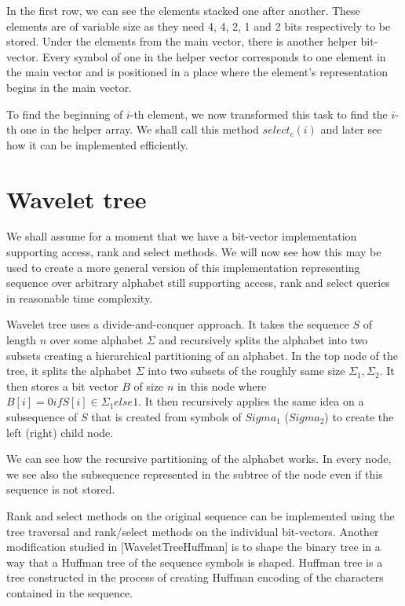 In the first row, we can see the elements stacked one after another. These elements
are of variable size as they need 4, 4, 2, 1 and 2 bits respectively to be stored.
Under the elements from the main vector, there is another helper bit-vector. Every
symbol of one in the helper vector corresponds to one element in the main vector
and is positioned in a place where the element's representation begins in the main vector.

To find the beginning of $i$-th element, we now transformed this task to find the
$i$-th one in the helper array. We shall call this method $select_c(i)$ and later
see how it can be implemented efficiently.

\section{Wavelet tree}
We shall assume for a moment that we have a bit-vector implementation supporting
access, rank and select methods. We will now see how this may be used to create
a more general version of this implementation representing sequence over arbitrary
alphabet still supporting access, rank and select queries in reasonable time complexity.

Wavelet tree uses a divide-and-conquer approach. It takes the sequence $S$ of
length $n$ over some alphabet $\Sigma$ and recursively splits the alphabet into
two subsets creating a hierarchical partitioning of an alphabet. In the top node
of the tree, it splits the alphabet $\Sigma$ into two subsets of the roughly same
size $\Sigma_1, \Sigma_2$. It then stores a bit vector $B$ of size $n$ in this node
where $B[i] = 0 if S[i] \in \Sigma_1 else 1$. It then recursively applies the same
idea on a subsequence of $S$ that is created from symbols of $Sigma_1$ ($Sigma_2$)
to create the left (right) child node.


We can see how the recursive partitioning of the alphabet works. In every node,
we see also the subsequence represented in the subtree of the node even if this
sequence is not stored. 

Rank and select methods on the original sequence can be implemented using the tree
traversal and rank/select methods on the individual bit-vectors. Another modification
studied in [WaveletTreeHuffman] is to shape the binary tree in a way that a Huffman
tree of the sequence symbols is shaped. Huffman tree is a tree constructed in the
process of creating Huffman encoding of the characters contained in the sequence.


